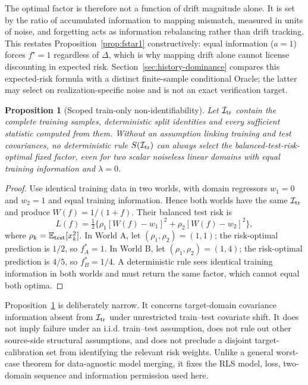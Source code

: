 \documentclass[10pt]{article}
\newtheorem{proposition}{Proposition}
\newcommand{\E}{\mathbb{E}}
\begin{document}
The optimal factor is therefore not a function of drift magnitude alone. It is
set by the ratio of accumulated information to mapping mismatch, measured in
units of noise, and forgetting acts as information rebalancing rather than
drift tracking.  This restates
Proposition~\ref{prop:fstar1} constructively: equal information ($a=1$) forces
$f^\star=1$ regardless of $\Delta$, which is why mapping drift alone cannot
license discounting in expected risk. Section~\ref{sec:history-dominance}
compares this expected-risk formula with a distinct finite-sample conditional
Oracle; the latter may select on realization-specific noise and is not an
exact verification target.

\begin{proposition}[Scoped train-only non-identifiability]
\label{prop:train_only_nonidentifiability}
Let $\mathcal I_{\rm tr}$ contain the complete training samples, deterministic
split identities and every sufficient statistic computed from them.  Without
an assumption linking training and test covariances, no deterministic rule
$S(\mathcal I_{\rm tr})$ can always select the balanced-test-risk-optimal
fixed factor, even for two scalar noiseless linear domains with equal training
information and $\lambda=0$.
\end{proposition}
\begin{proof}
Use identical training data in two worlds, with domain regressors $w_1=0$ and
$w_2=1$ and equal training information.  Hence both worlds have the same
$\mathcal I_{\rm tr}$ and produce
$W(f)=1/(1+f)$.  Their balanced test risk is
\begin{equation}
  L(f)=\tfrac12\{\rho_1[W(f)-w_1]^2+
                         \rho_2[W(f)-w_2]^2\},
\end{equation}
where $\rho_k=\E_{\rm test}[x_k^2]$.  In World A, let
$(\rho_1,\rho_2)=(1,1)$; the risk-optimal prediction is $1/2$, so
$f_A^*=1$.  In World B, let $(\rho_1,\rho_2)=(1,4)$; the risk-optimal
prediction is $4/5$, so $f_B^*=1/4$.  A deterministic rule sees identical
training information in both worlds and must return the same factor, which
cannot equal both optima.
\end{proof}

Proposition~\ref{prop:train_only_nonidentifiability} is deliberately narrow.
It concerns target-domain covariance information absent from
$\mathcal I_{\rm tr}$ under unrestricted train--test covariate shift.  It does
not imply failure under an i.i.d. train--test assumption, does not rule out
other source-side structural assumptions, and does not preclude a disjoint
target-calibration set from identifying the relevant risk weights.  Unlike a
general worst-case theorem for data-agnostic model merging, it fixes the RLS
model, loss, two-domain sequence and information permission used here.
\end{document}
